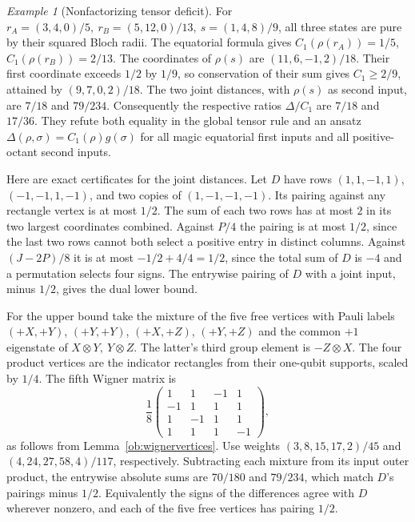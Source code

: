 \documentclass[aps,pra,onecolumn,superscriptaddress,nofootinbib,10pt]{revtex4-2}
\theoremstyle{definition}
\theoremstyle{remark}
\newtheorem{example}[theorem]{Example}
\begin{document}
\begin{example}[Nonfactorizing tensor deficit]\label{ob:wignerdeficit}
For \(r_A=(3,4,0)/5,\ r_B=(5,12,0)/13,\ s=(1,4,8)/9\), all
three states are pure by their squared Bloch radii. The equatorial
formula gives \(C_1(\rho(r_A))=1/5\), \(C_1(\rho(r_B))=2/13\).
The coordinates of \(\rho(s)\) are \((11,6,-1,2)/18\).
Their first coordinate exceeds \(1/2\) by \(1/9\), so conservation
of their sum gives \(C_1\ge2/9\), attained by \((9,7,0,2)/18\).
The two joint distances, with \(\rho(s)\) as second input, are
\(7/18\) and \(79/234\). Consequently the respective ratios
\(\Delta/C_1\) are \(7/18\) and \(17/36\). They refute both equality
in the global tensor rule and an ansatz
\(\Delta(\rho,\sigma)=C_1(\rho)g(\sigma)\) for all magic equatorial
first inputs and all positive-octant second inputs.

Here are exact certificates for the joint distances. Let \(D\)
have rows \((1,1,-1,1)\), \((-1,-1,1,-1)\), and two copies of
\((1,-1,-1,-1)\). Its pairing against any rectangle vertex is
at most \(1/2\). The sum of each two rows has at most \(2\) in
its two largest coordinates combined. Against \(P/4\) the pairing
is at most \(1/2\), since the last two rows cannot both select a
positive entry in distinct columns. Against \((J-2P)/8\) it is
at most \(-1/2+4/4=1/2\), since the total sum of \(D\) is
\(-4\) and a permutation selects four signs. The entrywise
pairing of \(D\) with a joint input, minus \(1/2\), gives the
dual lower bound.

For the upper bound take the mixture of the five free vertices
with Pauli labels
\((+X,+Y)\), \((+Y,+Y)\), \((+X,+Z)\), \((+Y,+Z)\) and the common \(+1\)
eigenstate of \(X\otimes Y,\ Y\otimes Z\). The latter's third
group element is \(-Z\otimes X\). The four product vertices
are the indicator rectangles from their one-qubit supports, scaled
by \(1/4\). The fifth Wigner matrix is
\[
 \frac18\begin{pmatrix}
 1&1&-1&1\\ -1&1&1&1\\ 1&-1&1&1\\ 1&1&1&-1
 \end{pmatrix},
\]
as follows from Lemma~\ref{ob:wignervertices}.
Use weights \((3,8,15,17,2)/45\) and \((4,24,27,58,4)/117\),
respectively. Subtracting each mixture from its input outer product,
the entrywise absolute sums are \(70/180\) and \(79/234\),
which match \(D\)'s pairings minus \(1/2\). Equivalently the signs
of the differences agree with \(D\) wherever nonzero, and each
of the five free vertices has pairing \(1/2\).
\end{example}
\end{document}
